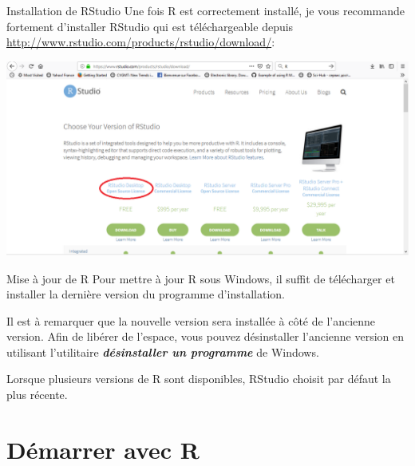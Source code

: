 \documentclass[
  8pt,
  ignorenonframetext,
]{beamer}
\begin{document}
\begin{frame}{Installation de RStudio}
\protect\hypertarget{installation-de-rstudio}{}
Une fois R est correctement installé, je vous recommande fortement
d'installer RStudio qui est téléchargeable depuis
\url{http://www.rstudio.com/products/rstudio/download/}:

\pause

\begin{center}\includegraphics[width=0.8\linewidth,height=0.7\textheight]{fig2} \end{center}
\end{frame}

\begin{frame}{Mise à jour de R}
\protect\hypertarget{mise-uxe0-jour-de-r}{}
Pour mettre à jour R sous Windows, il suffit de télécharger et installer
la dernière version du programme d'installation.

Il est à remarquer que la nouvelle version sera installée à côté de
l'ancienne version. Afin de libérer de l'espace, vous pouvez
désinstaller l'ancienne version en utilisant l'utilitaire
\textbf{\emph{désinstaller un programme}} de Windows.

Lorsque plusieurs versions de R sont disponibles, RStudio choisit par
défaut la plus récente.
\end{frame}

\hypertarget{duxe9marrer-avec-r}{%
\section{Démarrer avec R}\label{duxe9marrer-avec-r}}
\end{document}
